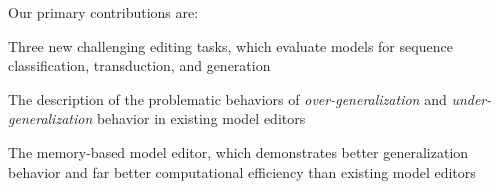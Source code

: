 Our primary contributions are:
\begin{compactenum}
    \item Three new challenging editing tasks, which evaluate models for sequence classification, transduction, and generation
    \item The description of the problematic behaviors of \textit{over-generalization} and \textit{under-generalization} behavior in existing model editors
    \item The memory-based model editor, which demonstrates better generalization behavior and far better computational efficiency than existing model editors
\end{compactenum}

